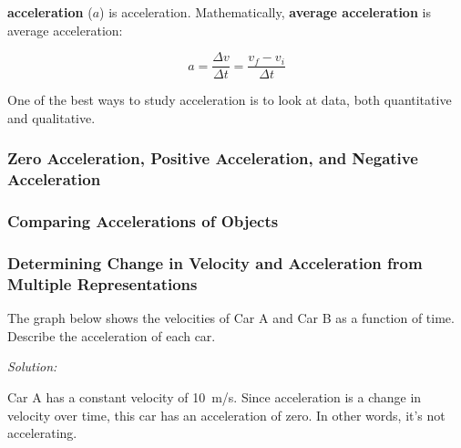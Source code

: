 \documentclass[dvipsnames]{article}
\begin{document}
\textbf{\Gls{acceleration}} ($a$) is \glsdesc{acceleration}. Mathematically, \textbf{\gls{average acceleration}} is \gls{average acceleration}:

\begin{equation*}
    a = \frac{\Delta v}{\Delta t} = \frac{v_f - v_i}{\Delta t}
\end{equation*}

One of the best ways to study acceleration is to look at data, both quantitative and qualitative. 

\subsubsection{Zero Acceleration, Positive Acceleration, and Negative Acceleration}

\subsubsection{Comparing Accelerations of Objects}

\subsubsection{Determining Change in Velocity and Acceleration from Multiple Representations}

\begin{example}
The graph below shows the velocities of Car A and Car B as a function of time. Describe the acceleration of each car.

\begin{center}
\end{center}
\end{example}

\textit{Solution:}

Car A has a constant velocity of \SI{10}{m/s}. Since acceleration is a change in velocity over time, this car has an acceleration of zero. In other words, it's not accelerating.
\end{document}
